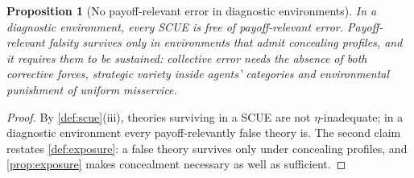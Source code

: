 \documentclass[11pt]{article}
\newtheorem{proposition}[assumption]{Proposition}
\theoremstyle{definition}
\begin{document}
\begin{proposition}[No payoff-relevant error in diagnostic environments]
\label{prop:diagnostic}
In a diagnostic environment, every SCUE is free of payoff-relevant error.
Payoff-relevant falsity survives only in environments that admit concealing
profiles, and it requires them to be sustained: collective error needs the
absence of \emph{both} corrective forces, strategic variety inside agents'
categories and environmental punishment of uniform misservice.
\end{proposition}

\begin{proof}
By \cref{def:scue}(iii), theories surviving in a SCUE are not
$\eta$-inadequate; in a diagnostic environment every payoff-relevantly false
theory is.  The second claim restates \cref{def:exposure}: a false theory
survives only under concealing profiles, and \cref{prop:exposure} makes
concealment necessary as well as sufficient.
\end{proof}
\end{document}
